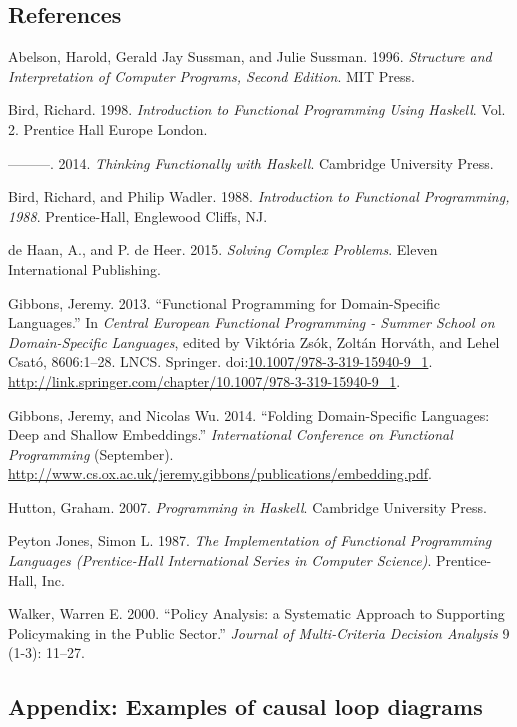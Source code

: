 \documentclass[]{article}
\begin{document}
\clearpage

\subsection{References}\label{references}

Abelson, Harold, Gerald Jay Sussman, and Julie Sussman. 1996.
\emph{Structure and Interpretation of Computer Programs, Second
Edition}. MIT Press.

Bird, Richard. 1998. \emph{Introduction to Functional Programming Using
Haskell}. Vol. 2. Prentice Hall Europe London.

---------. 2014. \emph{Thinking Functionally with Haskell}. Cambridge
University Press.

Bird, Richard, and Philip Wadler. 1988. \emph{Introduction to Functional
Programming, 1988}. Prentice-Hall, Englewood Cliffs, NJ.

{de Haan}, A., and P. de Heer. 2015. \emph{Solving Complex Problems}.
Eleven International Publishing.

Gibbons, Jeremy. 2013. ``Functional Programming for Domain-Specific
Languages.'' In \emph{Central European Functional Programming - Summer
School on Domain-Specific Languages}, edited by Viktória Zsók, Zoltán
Horváth, and Lehel Csató, 8606:1--28. LNCS. Springer.
doi:\href{http://dx.doi.org/10.1007/978-3-319-15940-9_1}{10.1007/978-3-319-15940-9\_1}.
\url{http://link.springer.com/chapter/10.1007/978-3-319-15940-9_1}.

Gibbons, Jeremy, and Nicolas Wu. 2014. ``Folding Domain-Specific
Languages: Deep and Shallow Embeddings.'' \emph{International Conference
on Functional Programming} (September).
\url{http://www.cs.ox.ac.uk/jeremy.gibbons/publications/embedding.pdf}.

Hutton, Graham. 2007. \emph{Programming in Haskell}. Cambridge
University Press.

Peyton Jones, Simon L. 1987. \emph{The Implementation of Functional
Programming Languages (Prentice-Hall International Series in Computer
Science)}. Prentice-Hall, Inc.

Walker, Warren E. 2000. ``Policy Analysis: a Systematic Approach to
Supporting Policymaking in the Public Sector.'' \emph{Journal of
Multi-Criteria Decision Analysis} 9 (1-3): 11--27.

\clearpage

\vspace*{5cm}

\subsection{{\large Appendix: Examples of causal loop diagrams}}\label{appendix}
\end{document}
